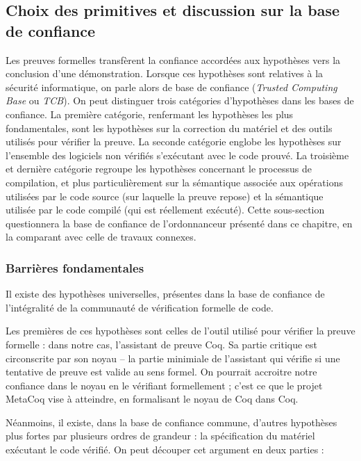 		\subsection{Choix des primitives et discussion sur la base de confiance}
		\label{sec:interfaceTCB}

		Les preuves formelles transfèrent la confiance accordées aux hypothèses vers la conclusion d'une démonstration. Lorsque ces hypothèses sont relatives à la sécurité informatique, on parle alors de base de confiance (\emph{Trusted Computing Base} ou \emph{TCB}). On peut distinguer trois catégories d'hypothèses dans les bases de confiance. La première catégorie, renfermant les hypothèses les plus fondamentales, sont les hypothèses sur la correction du matériel et des outils utilisés pour vérifier la preuve. La seconde catégorie englobe les hypothèses sur l'ensemble des logiciels non vérifiés s'exécutant avec le code prouvé. La troisième et dernière catégorie regroupe les hypothèses concernant le processus de compilation, et plus particulièrement sur la sémantique associée aux opérations utilisées par le code source (sur laquelle la preuve repose) et la sémantique utilisée par le code compilé (qui est réellement exécuté). Cette sous-section questionnera la base de confiance de l'ordonnanceur présenté dans ce chapitre, en la comparant avec celle de travaux connexes.

\subsubsection{Barrières fondamentales}

Il existe des hypothèses universelles, présentes dans la base de confiance de l'intégralité de la communauté de vérification formelle de code.

Les premières de ces hypothèses sont celles de l'outil utilisé pour vérifier la preuve formelle : dans notre cas, l'assistant de preuve Coq. Sa partie critique est circonscrite par son noyau -- la partie minimiale de l'assistant qui vérifie si une tentative de preuve est valide au sens formel. On pourrait accroitre notre confiance dans le noyau en le vérifiant formellement ; c'est ce que le projet MetaCoq \cite{metacoq} vise à atteindre, en formalisant le noyau de Coq dans Coq.

Néanmoins, il existe, dans la base de confiance commune, d'autres hypothèses plus fortes par plusieurs ordres de grandeur : la spécification du matériel exécutant le code vérifié. On peut découper cet argument en deux parties :

